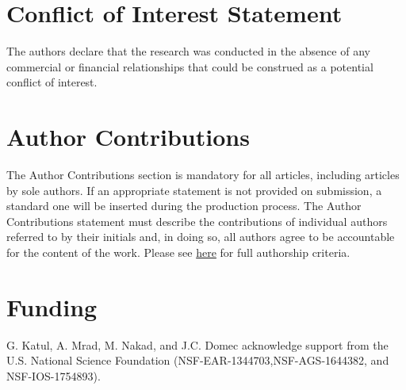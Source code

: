 \documentclass[utf8]{frontiersSCNS} %
\begin{document}




\section*{Conflict of Interest Statement}

The authors declare that the research was conducted in the absence of any commercial or financial relationships that could be construed as a potential conflict of interest.

\section*{Author Contributions}

The Author Contributions section is mandatory for all articles, including articles by sole authors. If an appropriate statement is not provided on submission, a standard one will be inserted during the production process. The Author Contributions statement must describe the contributions of individual authors referred to by their initials and, in doing so, all authors agree to be accountable for the content of the work. Please see  \href{http://home.frontiersin.org/about/author-guidelines#AuthorandContributors}{here} for full authorship criteria.

\section*{Funding}
G. Katul, A. Mrad, M. Nakad, and J.C. Domec acknowledge support from the U.S. National Science Foundation (NSF-EAR-1344703,NSF-AGS-1644382, and NSF-IOS-1754893).
\end{document}
